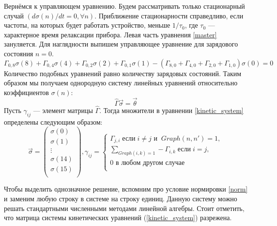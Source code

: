\documentclass[12pt,a4paper]{report}
\begin{document}
Вернёмся к управляющем уравнению. Будем рассматривать только стационарный случай $(d\sigma(n)/{dt} = 0 , \forall n)$.  Приближение стационарности справедливо, если частоты, на которых будет работать устройство, меньше $1/\tau_0$, где $\tau_0$ — характерное время релаксации прибора. Левая часть уравнения \ref{master} зануляется. Для наглядности выпишем управляющее уравнение для зарядового состояния $n = 0$.
\begin{equation}
\Gamma_{0, 8} \sigma(8) + \Gamma_{0, 4} \sigma(4) + \Gamma_{0, 2} \sigma(2) +\Gamma_{0, 1} \sigma(1) - (\Gamma_{8, 0} + \Gamma_{4, 0} + \Gamma_{2, 0} + \Gamma_{1, 0})\sigma(0) = 0
\end{equation}
Количество подобных уравнений равно количеству зарядовых состояний. Таким образом мы получаем однородную систему линейных уравнений относительно коэффициентов $\sigma(n)$: 
\begin{equation}\label{kinetic_system}
\hat \Gamma \vec{\sigma} = \vec{\theta}
\end{equation}
Пусть $\gamma_{ij}$ — элемент матрицы $\hat \Gamma$. Тогда множители в уравнении \ref{kinetic_system} определены следующим образом:
\begin{equation}
\vec{\sigma} = \left(
\begin{array}{c}
  \sigma(0)\\
  \sigma(1)\\
 \vdots\\
  \sigma(14)\\
  \sigma(15)\\
  \end{array}
  \right),   \gamma_{ij}=
  \left\{
  \begin{array}{c}
    \Gamma_{j,i}\;\mbox{если}\;i \neq j \mbox{ и }\ Graph(n, n') = 1,\\
    \sum\limits_{Graph(i, k) = 1} -\Gamma_{i,k} \;\mbox{если}\;i = j, \\
    0 \mbox{ в любом другом случае }\\\
  \end{array}
  \right.
\end{equation}

Чтобы выделить однозначное решение, вспомним про условие нормировки \ref{norm} и заменим любую строку в системе на строку единиц. Данную систему можно решать стандартными численными методами  линейной алгебры. Стоит отметить, что матрица системы кинетических уравнений (\ref{kinetic_system}) разрежена.
\end{document}
